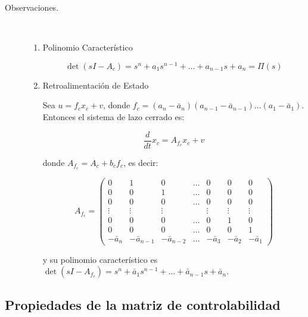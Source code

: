 \begin{description}
\item [Observaciones.] \mbox{}\\
\begin{enumerate}
\item Polinomio Característico

\begin{equation}
\det{(sI - A_c)} = s^n + a_1 s^{n-1} + \dots + a_{n-1} s + a_n = \Pi(s) \nonumber
\end{equation}

\item Retroalimentación de Estado

Sea $u = f_c x_c + v$, donde $f_c = (a_n - \bar{a}_n)(a_{n-1} - \bar{a}_{n-1})\dots(a_1 - \bar{a}_1)$. Entonces el sistema de lazo cerrado es:

\begin{equation}
\frac{d}{dt} x_c = A_{f_c} x_c + v
\end{equation}

donde $A_{f_c} = A_c + b_c f_c$, es decir:

\begin{equation}
A_{f_c} =
\begin{pmatrix}
0 & 1 & 0 & \dots & 0 & 0 & 0 \\
0 & 0 & 1 & \dots & 0 & 0 & 0 \\
0 & 0 & 0 & \dots & 0 & 0 & 0 \\
\vdots & \vdots & \vdots & & \vdots & \vdots & \vdots \\
0 & 0 & 0 & \dots & 0 & 1 & 0 \\
0 & 0 & 0 & \dots & 0 & 0 & 1 \\
-\bar{a}_{n} & -\bar{a}_{n-1} & -\bar{a}_{n-2} & \dots & -\bar{a}_{3} & -\bar{a}_{2} & -\bar{a}_{1}
\end{pmatrix}
\end{equation}

y su polinomio característico es $\det{(sI - A_{f_c})} = s^n + \bar{a}_1 s^{n-1} + \dots + \bar{a}_{n-1} s + \bar{a}_n$.

\end{enumerate}
\end{description}

\subsection{Propiedades de la matriz de controlabilidad}

